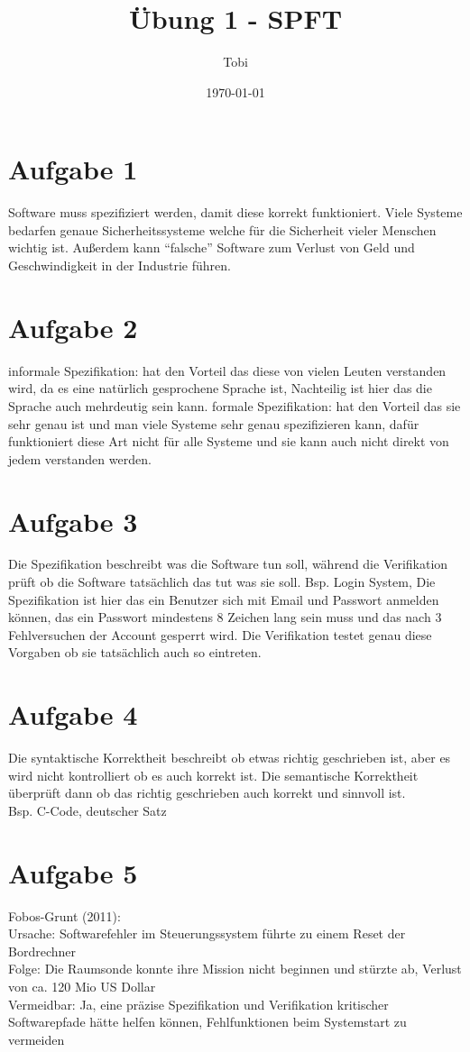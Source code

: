 \documentclass[a4paper,12pt]{article}
\title{Übung 1 - SPFT}
\author{Tobi}
\date{\today}
\begin{document}
\maketitle

\section*{Aufgabe 1}
Software muss spezifiziert werden, damit diese korrekt funktioniert. Viele Systeme bedarfen genaue Sicherheitssysteme
welche für die Sicherheit vieler Menschen wichtig ist. Außerdem kann ``falsche'' Software zum Verlust von Geld und Geschwindigkeit in
der Industrie führen.

\section*{Aufgabe 2}
informale Spezifikation: hat den Vorteil das diese von vielen Leuten verstanden wird, da es eine natürlich gesprochene Sprache ist, Nachteilig
ist hier das die Sprache auch mehrdeutig sein kann.
formale Spezifikation: hat den Vorteil das sie sehr genau ist und man viele Systeme sehr genau spezifizieren kann, dafür funktioniert diese Art 
nicht für alle Systeme und sie kann auch nicht direkt von jedem verstanden werden.

\section*{Aufgabe 3}
Die Spezifikation beschreibt was die Software tun soll, während die Verifikation prüft ob die Software tatsächlich das tut was sie soll.
Bsp. Login System, Die Spezifikation ist hier das ein Benutzer sich mit Email und Passwort anmelden können, das ein Passwort mindestens 8 
Zeichen lang sein muss und das nach 3 Fehlversuchen der Account gesperrt wird. Die Verifikation testet genau diese Vorgaben ob sie tatsächlich
auch so eintreten.

\section*{Aufgabe 4}
Die syntaktische Korrektheit beschreibt ob etwas richtig geschrieben ist, aber es wird nicht kontrolliert ob es auch korrekt ist.
Die semantische Korrektheit überprüft dann ob das richtig geschrieben auch korrekt und sinnvoll ist.\\
Bsp. C-Code, deutscher Satz

\section*{Aufgabe 5}
Fobos-Grunt (2011):\\
Ursache: Softwarefehler im Steuerungssystem führte zu einem Reset der Bordrechner\\
Folge: Die Raumsonde konnte ihre Mission nicht beginnen und stürzte ab, Verlust von ca. 120 Mio US Dollar\\
Vermeidbar: Ja, eine präzise Spezifikation und Verifikation kritischer Softwarepfade hätte helfen können, Fehlfunktionen beim Systemstart zu vermeiden\\
\end{document}
